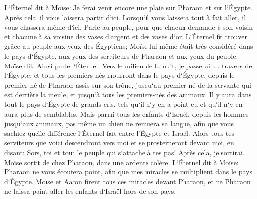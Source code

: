 \verse L`Éternel dit à Moïse: Je ferai venir encore une plaie sur Pharaon et sur l`Égypte. Après cela, il vous laissera partir d`ici. Lorsqu`il vous laissera tout à fait aller, il vous chassera même d`ici. 
\verse Parle au peuple, pour que chacun demande à son voisin et chacune à sa voisine des vases d`argent et des vases d`or. 
\verse L`Éternel fit trouver grâce au peuple aux yeux des Égyptiens; Moïse lui-même était très considéré dans le pays d`Égypte, aux yeux des serviteurs de Pharaon et aux yeux du peuple. 
\verse Moïse dit: Ainsi parle l`Éternel: Vers le milieu de la nuit, je passerai au travers de l`Égypte; 
\verse et tous les premiers-nés mourront dans le pays d`Égypte, depuis le premier-né de Pharaon assis sur son trône, jusqu`au premier-né de la servante qui est derrière la meule, et jusqu`à tous les premiers-nés des animaux. 
\verse Il y aura dans tout le pays d`Égypte de grands cris, tels qu`il n`y en a point eu et qu`il n`y en aura plus de semblables. 
\verse Mais parmi tous les enfants d`Israël, depuis les hommes jusqu`aux animaux, pas même un chien ne remuera sa langue, afin que vous sachiez quelle différence l`Éternel fait entre l`Égypte et Israël. 
\verse Alors tous tes serviteurs que voici descendront vers moi et se prosterneront devant moi, en disant: Sors, toi et tout le peuple qui s`attache à tes pas! Après cela, je sortirai. Moïse sortit de chez Pharaon, dans une ardente colère. 
\verse L`Éternel dit à Moïse: Pharaon ne vous écoutera point, afin que mes miracles se multiplient dans le pays d`Égypte. 
\verse Moïse et Aaron firent tous ces miracles devant Pharaon, et ne Pharaon ne laissa point aller les enfants d`Israël hors de son pays. 

\chapter{}

